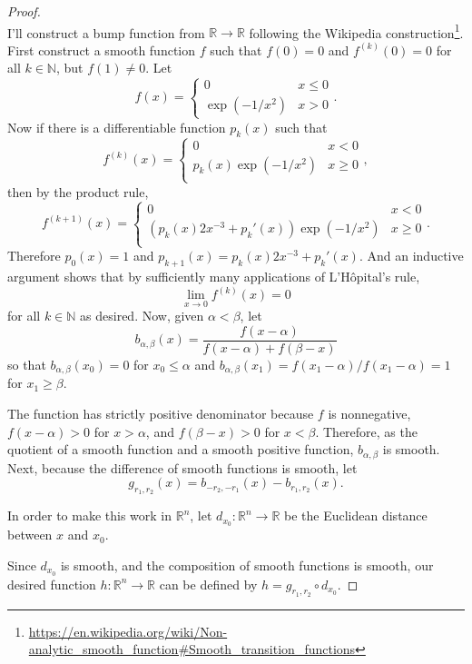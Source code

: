 \documentclass{article}
\begin{document}
\begin{proof} \text{} \\
  I'll construct a bump function from $\mathbb{R}\rightarrow\mathbb{R}$
  following the Wikipedia construction\footnote{
    \url{https://en.wikipedia.org/wiki/Non-analytic_smooth_function\#Smooth_transition_functions}
  }.
  First construct a smooth function $f$ such that $f(0) = 0$ and
  $f^{(k)}(0) = 0$ for all $k \in \mathbb{N}$, but $f(1) \not=0$.
  Let \[
    f(x) = \begin{cases}
      0 & x \leq 0\\
      \exp(-1/x^2) & x > 0
    \end{cases}.
  \]
  Now if there is a differentiable function $p_k(x)$ such that \[
  f^{(k)}(x) = \begin{cases}
    0 & x < 0 \\
    p_k(x)\exp(-1/x^2) & x \geq 0 \\
  \end{cases},
  \]
  then by the product rule, \[
  f^{(k+1)}(x) = \begin{cases}
    0 & x < 0 \\
    (p_k(x)2x^{-3} + p_k'(x))\exp(-1/x^2) & x \geq 0 \\
  \end{cases}.
  \] Therefore $p_0(x) = 1$ and $p_{k + 1}(x) = p_k(x)2x^{-3} + p_k'(x)$.
  And an inductive argument shows that by sufficiently many applications of
  L'H\^{o}pital's rule, \[
    \lim_{x\rightarrow 0}f^{(k)}(x) = 0
  \] for all $k \in \mathbb{N}$ as desired.
  Now, given $\alpha < \beta$, let \[
    b_{\alpha,\beta}(x) = \frac{f(x - \alpha)}{f(x - \alpha) + f(\beta - x)}
  \]
  so that $b_{\alpha,\beta}(x_0) = 0$ for $x_0 \leq \alpha$ and
  $b_{\alpha,\beta}(x_1) = f(x_1-\alpha)/f(x_1-\alpha) = 1$ for $x_1 \geq \beta$.

  The function has strictly positive denominator because $f$ is nonnegative,
  $f(x-\alpha) > 0$ for $x > \alpha$, and
  $f(\beta - x) > 0$ for $x < \beta$. Therefore, as the quotient of a smooth
  function and a smooth positive function, $b_{\alpha,\beta}$ is smooth.
%
  Next, because the difference of smooth functions is smooth, let \[
    g_{r_1,r_2}(x) = b_{-r_2,-r_1}(x) - b_{r_1,r_2}(x).
  \]

  In order to make this work in $\mathbb{R}^n$,
  let $d_{x_0}: \mathbb{R}^n \rightarrow \mathbb{R}$ be the Euclidean distance
  between $x$ and $x_0$.

  Since $d_{x_0}$ is smooth, and the composition of smooth functions is smooth,
  our desired function $h: \mathbb{R}^n \rightarrow \mathbb{R}$ can be defined
  by $h = g_{r_1,r_2} \circ d_{x_0}$.
\end{proof}
\end{document}
